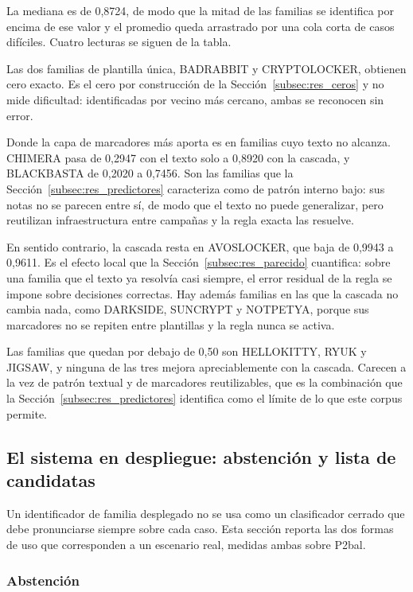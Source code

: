La mediana es de 0,8724, de modo que la mitad de las familias se identifica por encima de ese valor y el promedio queda arrastrado por una cola corta de casos difíciles. Cuatro lecturas se siguen de la tabla.

Las dos familias de plantilla única, BADRABBIT y CRYPTOLOCKER, obtienen cero exacto. Es el cero por construcción de la Sección~\ref{subsec:res_ceros} y no mide dificultad: identificadas por vecino más cercano, ambas se reconocen sin error.

Donde la capa de marcadores más aporta es en familias cuyo texto no alcanza. CHIMERA pasa de 0,2947 con el texto solo a 0,8920 con la cascada, y BLACKBASTA de 0,2020 a 0,7456. Son las familias que la Sección~\ref{subsec:res_predictores} caracteriza como de patrón interno bajo: sus notas no se parecen entre sí, de modo que el texto no puede generalizar, pero reutilizan infraestructura entre campañas y la regla exacta las resuelve.

En sentido contrario, la cascada resta en AVOSLOCKER, que baja de 0,9943 a 0,9611. Es el efecto local que la Sección~\ref{subsec:res_parecido} cuantifica: sobre una familia que el texto ya resolvía casi siempre, el error residual de la regla se impone sobre decisiones correctas. Hay además familias en las que la cascada no cambia nada, como DARKSIDE, SUNCRYPT y NOTPETYA, porque sus marcadores no se repiten entre plantillas y la regla nunca se activa.

Las familias que quedan por debajo de 0,50 son HELLOKITTY, RYUK y JIGSAW, y ninguna de las tres mejora apreciablemente con la cascada. Carecen a la vez de patrón textual y de marcadores reutilizables, que es la combinación que la Sección~\ref{subsec:res_predictores} identifica como el límite de lo que este corpus permite.



\subsection{El sistema en despliegue: abstención y lista de candidatas}
\label{subsec:res_despliegue}

Un identificador de familia desplegado no se usa como un clasificador cerrado que debe pronunciarse siempre sobre cada caso. Esta sección reporta las dos formas de uso que corresponden a un escenario real, medidas ambas sobre P2bal.

\subsubsection*{Abstención}

